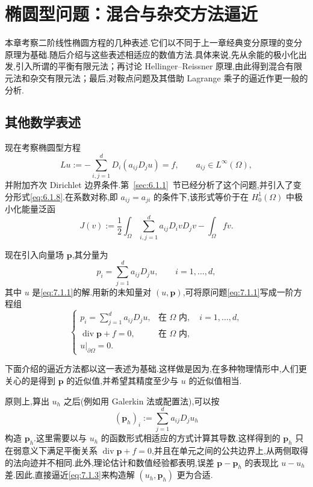 \chapter{椭圆型问题：混合与杂交方法逼近}\label{ch:7}

本章考察二阶线性椭圆方程的几种表述.它们以不同于上一章经典变分原理的变分原理为基础.随后介绍与这些表述相适应的数值方法.具体来说,先从余能的极小化出发,引入所谓的平衡有限元法；再讨论 Hellinger--Reissner 原理,由此得到混合有限元法和杂交有限元法；最后,对鞍点问题及其借助 Lagrange 乘子的逼近作更一般的分析.

\section{其他数学表述}\label{sec:7.1}

现在考察椭圆型方程
\begin{equation}\label{eq:7.1.1}
  Lu:=-\sum_{i,j=1}^d D_i(a_{ij}D_ju)=f,\qquad a_{ij}\in L^\infty(\Omega),
\end{equation}
并附加齐次 Dirichlet 边界条件.第~\ref{sec:6.1.1}~节已经分析了这个问题,并引入了变分形式\eqref{eq:6.1.8}.在系数对称,即 \(a_{ij}=a_{ji}\) 的条件下,该形式等价于在 \(H_0^1(\Omega)\) 中极小化能量泛函
\begin{equation}\label{eq:7.1.2}
  J(v):=\frac12\int_\Omega\sum_{i,j=1}^d a_{ij}D_ivD_jv-\int_\Omega fv.
\end{equation}

现在引入向量场 \(\boldsymbol{p}\),其分量为
\[
  p_i=\sum_{j=1}^d a_{ij}D_ju,\qquad i=1,\ldots,d,
\]
其中 \(u\) 是\eqref{eq:7.1.1}的解.用新的未知量对 \((u,\boldsymbol{p})\),可将原问题\eqref{eq:7.1.1}写成一阶方程组
\begin{equation}\label{eq:7.1.3}
  \begin{cases}
    p_i=\displaystyle\sum_{j=1}^d a_{ij}D_ju,&\text{在 }\Omega\text{ 内},\quad i=1,\ldots,d,\\
    \operatorname{div}\boldsymbol{p}+f=0,&\text{在 }\Omega\text{ 内},\\
    u|_{\partial\Omega}=0.&
  \end{cases}
\end{equation}

下面介绍的逼近方法都以这一表述为基础.这样做是因为,在多种物理情形中,人们更关心的是得到 \(\boldsymbol{p}\) 的近似值,并希望其精度至少与 \(u\) 的近似值相当.

原则上,算出 \(u_h\) 之后(例如用 Galerkin 法或配置法),可以按
\[
  (\boldsymbol{p}_h)_i:=\sum_{j=1}^d a_{ij}D_ju_h
\]
构造 \(\boldsymbol{p}_h\).这里需要以与 \(u_h\) 的函数形式相适应的方式计算其导数.这样得到的 \(\boldsymbol{p}_h\) 只在弱意义下满足平衡关系 \(\operatorname{div}\boldsymbol{p}+f=0\),并且在单元之间的公共边界上,从两侧取得的法向迹并不相同.此外,理论估计和数值经验都表明,误差 \(\boldsymbol{p}-\boldsymbol{p}_h\) 的表现比 \(u-u_h\) 差.因此,直接逼近\eqref{eq:7.1.3}来构造解 \((u_h,\boldsymbol{p}_h)\) 更为合适.

